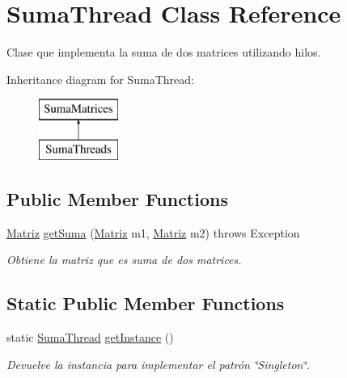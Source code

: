 \hypertarget{classSumaThread}{\section{Suma\-Thread Class Reference}
\label{classSumaThread}
}


Clase que implementa la suma de dos matrices utilizando hilos.  


Inheritance diagram for Suma\-Thread\-:\begin{figure}[H]
\begin{center}
\leavevmode
\includegraphics[height=2.000000cm]{classSumaThread}
\end{center}
\end{figure}
\subsection*{Public Member Functions}
\begin{DoxyCompactItemize}
\item 
\hyperlink{classMatriz}{Matriz} \hyperlink{classSumaThread_ae9ba2f519d9a7069da18eb420324dc7f}{get\-Suma} (\hyperlink{classMatriz}{Matriz} m1, \hyperlink{classMatriz}{Matriz} m2)  throws Exception 
\begin{DoxyCompactList}\small\item\em Obtiene la matriz que es suma de dos matrices. \end{DoxyCompactList}\end{DoxyCompactItemize}
\subsection*{Static Public Member Functions}
\begin{DoxyCompactItemize}
\item 
static \hyperlink{classSumaThread}{Suma\-Thread} \hyperlink{classSumaThread_a255286847e5f81e3e7fc3e27e6ff8443}{get\-Instance} ()
\begin{DoxyCompactList}\small\item\em Devuelve la instancia para implementar el patrón \char`\"{}\-Singleton\char`\"{}. \end{DoxyCompactList}\end{DoxyCompactItemize}


